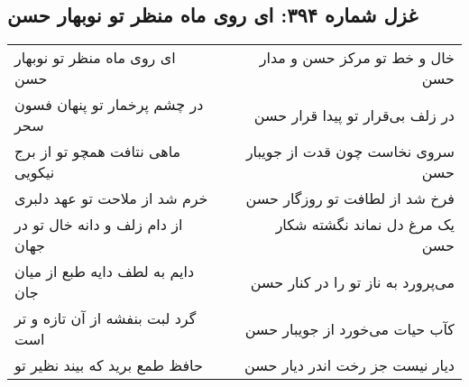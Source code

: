 \begin{center}
\section*{غزل شماره ۳۹۴: ای روی ماه منظر تو نوبهار حسن}
\label{sec:sh394}
\begin{longtable}{l p{0.5cm} r}
ای روی ماه منظر تو نوبهار حسن
&&
خال و خط تو مرکز حسن و مدار حسن
\\
در چشم پرخمار تو پنهان فسون سحر
&&
در زلف بی‌قرار تو پیدا قرار حسن
\\
ماهی نتافت همچو تو از برج نیکویی
&&
سروی نخاست چون قدت از جویبار حسن
\\
خرم شد از ملاحت تو عهد دلبری
&&
فرخ شد از لطافت تو روزگار حسن
\\
از دام زلف و دانه خال تو در جهان
&&
یک مرغ دل نماند نگشته شکار حسن
\\
دایم به لطف دایه طبع از میان جان
&&
می‌پرورد به ناز تو را در کنار حسن
\\
گرد لبت بنفشه از آن تازه و تر است
&&
کآب حیات می‌خورد از جویبار حسن
\\
حافظ طمع برید که بیند نظیر تو
&&
دیار نیست جز رخت اندر دیار حسن
\\
\end{longtable}
\end{center}
